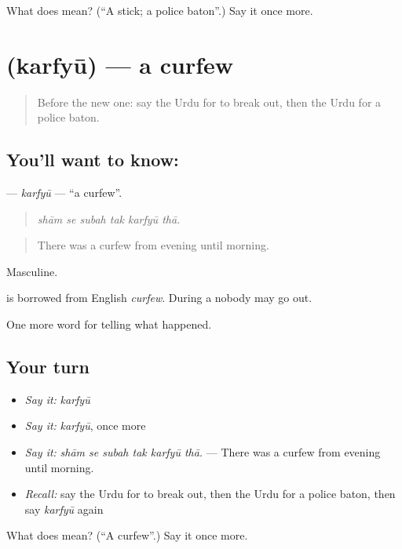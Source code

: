 \begin{tcolorbox}[breakable,colback=teal!4,colframe=teal!35!black,title={Before you move on}]
What does  mean? (\textquotedblleft{}A stick; a police baton\textquotedblright{}.) Say it once more.
\end{tcolorbox}
\section[\texorpdfstring{\ur{کرفیو} (karfyū)}{کرفیو (karfyū)}]{ (karfyū) — a curfew}

\label{lesson:UR-C304-karfyu}



\begin{quote}
Before the new one: say the Urdu for to break out, then the Urdu for a police baton.
\end{quote}

\subsection*{You'll want to know: }
\textbf{} — \emph{karfyū} — \textquotedblleft{}a curfew\textquotedblright{}.

\begin{quote}
     
\end{quote}

\begin{quote}
\emph{shām se subah tak karfyū thā.}
\end{quote}

\begin{quote}
There was a curfew from evening until morning.
\end{quote}

Masculine.

\begin{cousinweb}
is borrowed from English \emph{curfew}. During a \textbf{} nobody may go out.
\end{cousinweb}

\begin{grammarlens}[title={What you've built}]
One more word for telling what happened.
\end{grammarlens}

\subsection*{Your turn}
\begin{itemize}
\raggedright
  \item \emph{Say it:} \emph{karfyū}
  \item \emph{Say it:} \emph{karfyū}, once more
  \item \emph{Say it:} \emph{shām se subah tak karfyū thā.} — There was a curfew from evening until morning.
  \item \emph{Recall:} say the Urdu for to break out, then the Urdu for a police baton, then say \emph{karfyū} again
\end{itemize}

\begin{tcolorbox}[breakable,colback=teal!4,colframe=teal!35!black,title={Before you move on}]
What does  mean? (\textquotedblleft{}A curfew\textquotedblright{}.) Say it once more.
\end{tcolorbox}
